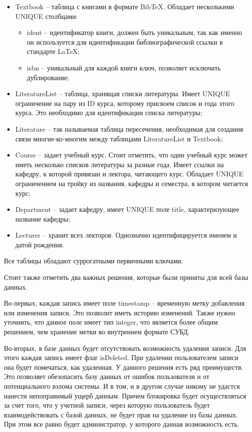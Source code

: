 \begin{itemize}
    \item Textbook -- таблица с книгами в формате BibTeX. Обладает несколькими UNIQUE столбцами:
        \begin{itemize}
            \item ident -- идентификатор книги, должен быть уникальным, так как именно
                он используется для идентификации библиографической ссылки в стандарте LaTeX;
            \item isbn -- уникальный для каждой книги ключ, позволяет исключить дублирование;
        \end{itemize}
    \item LiteratureList -- таблица, хранящая списки литературы. Имеет UNIQUE ограничение на
        пару из ID курса, которому присвоем список и года этого курса. Это необходимо для
        идентификации списка литературы;
    \item Literature -- так называемая таблица пересечения, необходимая для создания связи
        многие-ко-многим между таблицами LiteratureList и Textbook;
    \item Course -- задает учебный курс. Стоит отметить, что один учебный курс может иметь
        несколько списков литературы за разные года. Имеет ссылки на кафедру, к которой 
        привязан и лектора, читающего курс. Обладает UNIQUE ограничением на тройку из
        названия, кафедры и семестра, в котором читается курс;
    \item Department -- задает кафедру, имеет UNIQUE поле title, характеризующее
        название кафедры;
    \item Lecturer -- хранит всех лекторов. Однозначно идентифицируется именем и датой рождения.
\end{itemize}

Все таблицы обладают суррогатными первичными ключами.

Стоит также отметить два важных решения, которые были приняты для всей базы данных.

Во-первых, каждая запись имеет поле timestamp -- временную метку добавления или изменения записи.
Это позволит иметь историю изменений. Также нужно уточнить, что данное поле имеет тип integer,
что является более общим решением, чем хранение метки во внутреннем формате СУБД.

Во-вторых, в базе данных будет отсутствовать возможность удаления записи. Для этого каждая
запись имеет флаг isDeleted. При удалении пользователем записи она будет помечаться, как удаленная.
У данного решения есть ряд преимуществ. Это позволяет обезопасить базу данных от ошибок пользователя
и от потенциального взлома системы. И в том, и в другом случае никому не удастся нанести
непоправимый ущерб данным. Причем блокировка будет осуществляться за счет того, что у учетной записи,
через которую пользователь будет взаимодействовать с базой данных, не будет прав на удаление из базы данных.
При этом все равно будет администратор, у которого данная возможность есть.

